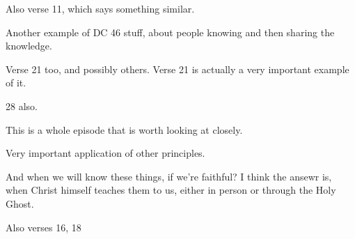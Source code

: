 \begin{compactdesc}
			\item[{\hyperref[3NEPHI-17-24]{3 Nephi 17:24--25}}]
			\item[{\hyperref[3NEPHI-18-7]{3 Nephi 18:7}}] \phantom{.}
				\begin{compactitem}
					\item Also verse 11, which says something similar.
				\end{compactitem}
			\item[{\hyperref[3NEPHI-18-25]{3 Nephi 18:25}}]
			\item[{\hyperref[3NEPHI-19-2]{3 Nephi 19:2--3}}] \phantom{.}
				\begin{compactitem}
					\item Another example of DC 46 stuff, about people knowing and then sharing the knowledge.
					\item Verse 21 too, and possibly others. Verse 21 is actually a very important example of it.
					\item 28 also.
				\end{compactitem}
			\item[{\hyperref[3NEPHI-19-9]{3 Nephi 19:9--36}}] \phantom{.}
				\begin{compactitem}
					\item This is a whole episode that is worth looking at closely.
				\end{compactitem}
			\item[{\hyperref[3NEPHI-20-8]{3 Nephi 20:8--9}}]
			\item[{\hyperref[3NEPHI-20-27]{3 Nephi 20:27}}]
			\item[{\hyperref[3NEPHI-21-2]{3 Nephi 21:2}}]
			\item[{\hyperref[3NEPHI-21-6]{3 Nephi 21:6}}]
			\item[{\hyperref[3NEPHI-26-6]{3 Nephi 26:6--12}}] \phantom{.}
				\begin{compactitem}
					\item Very important application of other principles.
					\item And when we will know these things, if we're faithful? I think the ansewr is, when Christ himself teaches them to us, either in person or through the Holy Ghost.
				\end{compactitem}
			\item[{\hyperref[3NEPHI-26-14]{3 Nephi 26:14}}] \phantom{.}
				\begin{compactitem}
					\item Also verses 16, 18
				\end{compactitem}

\end{compactdesc}
